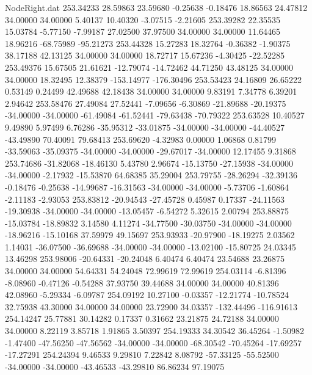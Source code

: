 \begin{filecontents}{NodeRight.dat}
 253.34233   28.59863   23.59680    -0.25638   -0.18476   18.86563   24.47812   34.00000   34.00000    5.40137   10.40320   -3.07515   -2.21605
 253.39282   22.35535   15.03784    -5.77150   -7.99187   27.02500   37.97500   34.00000   34.00000   11.64465   18.96216  -68.75989  -95.21273
 253.44328   15.27283   18.32764    -0.36382   -1.90375   38.17188   42.13125   34.00000   34.00000   18.72717   15.67236   -4.30425  -22.52285
 253.49376   15.67505   21.61621   -12.79074  -14.72462   44.71250   43.48125   34.00000   34.00000   18.32495   12.38379 -153.14977 -176.30496
 253.53423   24.16809   26.65222     0.53149    0.24499   42.49688   42.18438   34.00000   34.00000    9.83191    7.34778    6.39201    2.94642
 253.58476   27.49084   27.52441    -7.09656   -6.30869  -21.89688  -20.19375  -34.00000  -34.00000  -61.49084  -61.52441  -79.63438  -70.79322
 253.63528   10.40527    9.49890     5.97499    6.76286  -35.95312  -33.01875  -34.00000  -34.00000  -44.40527  -43.49890   70.40091   79.68413
 253.69620   -4.32983    0.00000     1.06868    0.81799  -33.59063  -35.09375  -34.00000  -34.00000  -29.67017  -34.00000   12.17455    9.31868
 253.74686  -31.82068  -18.46130     5.43780    2.96674  -15.13750  -27.15938  -34.00000  -34.00000   -2.17932  -15.53870   64.68385   35.29004
 253.79755  -28.26294  -32.39136    -0.18476   -0.25638  -14.99687  -16.31563  -34.00000  -34.00000   -5.73706   -1.60864   -2.11183   -2.93053
 253.83812  -20.94543  -27.45728     0.45987    0.17337  -24.11563  -19.30938  -34.00000  -34.00000  -13.05457   -6.54272    5.32615    2.00794
 253.88875  -15.03784  -18.89832     3.14580    4.11274  -34.77500  -30.03750  -34.00000  -34.00000  -18.96216  -15.10168   37.59979   49.15697
 253.93933  -20.97900  -18.19275     2.03562    1.14031  -36.07500  -36.69688  -34.00000  -34.00000  -13.02100  -15.80725   24.03345   13.46298
 253.98006  -20.64331  -20.24048     6.40474    6.40474   23.54688   23.26875   34.00000   34.00000   54.64331   54.24048   72.99619   72.99619
 254.03114   -6.81396   -8.08960    -0.47126   -0.54288   37.93750   39.44688   34.00000   34.00000   40.81396   42.08960   -5.29334   -6.09787
 254.09192   10.27100   -0.03357   -12.21774  -10.78524   32.75938   43.30000   34.00000   34.00000   23.72900   34.03357 -132.44496 -116.91613
 254.14247   25.77881   30.14282     0.17337    0.31662   23.21875   24.72188   34.00000   34.00000    8.22119    3.85718    1.91865    3.50397
 254.19333   34.30542   36.45264    -1.50982   -1.47400  -47.56250  -47.56562  -34.00000  -34.00000  -68.30542  -70.45264  -17.69257  -17.27291
 254.24394    9.46533    9.29810     7.22842    8.08792  -57.33125  -55.52500  -34.00000  -34.00000  -43.46533  -43.29810   86.86234   97.19075

\end{filecontents}
